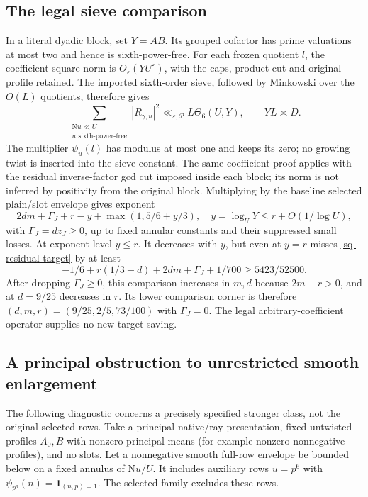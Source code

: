 \documentclass[11pt]{article}
\theoremstyle{definition}
\newcommand{\N}{\mathrm N}
\newcommand{\eps}{\varepsilon}
\newcommand{\Id}{\mathbf 1}
\newcommand{\lls}{\ll_{\eps,\mathcal P}}
\begin{document}
\subsection{The legal sieve comparison}
In a literal dyadic block, set $Y=AB$. Its grouped cofactor has prime
valuations at most two and hence is sixth-power-free. For each frozen
quotient $l$, the coefficient square norm is $O_\eps(YU^\eps)$,
with the caps, product cut and original profile retained. The imported
sixth-order sieve, followed by Minkowski over the $O(L)$ quotients,
therefore gives
\begin{equation}\label{sq-block-sieve}
 \sum_{\substack{\N u\ll U\\u\text{ sixth-power-free}}}|R_{\gamma,u}|^2
 \lls L\Theta_6(U,Y),\qquad YL\asymp D.
\end{equation}
The multiplier $\psi_u(l)$ has modulus at most one and keeps its zero;
no growing twist is inserted into the sieve constant. The same coefficient
proof applies with the residual inverse-factor gcd cut imposed inside each
block; its norm is not inferred by positivity from the original block.
Multiplying by the baseline selected plain/slot envelope gives exponent
\[
 2dm+\Gamma_J+r-y+\max(1,5/6+y/3),\quad
 y=\log_UY\le r+O(1/\log U),
\]
with $\Gamma_J=dz_J\ge0$, up to fixed annular constants and their
suppressed small losses. At exponent level $y\le r$.
It decreases with $y$, but even at $y=r$ misses
\eqref{sq-residual-target} by at least
\begin{equation}\label{sq-sieve-deficit}
 -1/6+r(1/3-d)+2dm+\Gamma_J+1/700\ge5423/52500.
\end{equation}
After dropping $\Gamma_J\ge0$, this comparison increases in $m,d$
because $2m-r>0$, and at $d=9/25$
decreases in $r$. Its lower comparison corner is therefore
$(d,m,r)=(9/25,2/5,73/100)$ with $\Gamma_J=0$.
The legal arbitrary-coefficient operator supplies no new target saving.

\subsection{A principal obstruction to unrestricted smooth enlargement}
\label{sq-smooth-obstruction}
The following diagnostic concerns a precisely specified stronger class,
not the original selected rows. Take a principal native/ray presentation,
fixed untwisted profiles $A_0,B$ with nonzero principal means (for example
nonzero nonnegative profiles), and no slots. Let a nonnegative smooth
full-row envelope be bounded below on a fixed annulus of $\N u/U$.
It includes auxiliary rows $u=p^6$ with
$\psi_{p^6}(n)=\Id_{(n,p)=1}$. The selected family excludes these rows.
\end{document}
